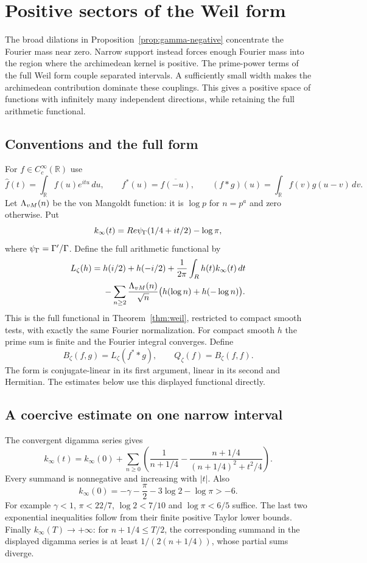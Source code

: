 \section{Positive sectors of the Weil form}
\label{intake:weil:section}

The broad dilations in Proposition~\ref{prop:gamma-negative}
concentrate the Fourier mass near zero. Narrow support instead forces
enough Fourier mass into the region where the archimedean kernel is positive.
The prime-power terms of the full Weil form couple separated intervals.
A sufficiently small width makes the archimedean contribution dominate these couplings.
This gives a positive space of functions with infinitely many independent directions,
while retaining the full arithmetic functional.

\subsection{Conventions and the full form}
For $f\in C_c^\infty(\mathbb R)$ use
\[
 \widehat f(t)=\int_\mathbb R f(u)e^{itu}\,du,\qquad
 f^*(u)=\overline{f(-u)},\qquad
 (f*g)(u)=\int_\mathbb R f(v)g(u-v)\,dv.
\]
Let $\Lambda_{vM}(n)$ be the von Mangoldt function: it is $\log p$ for $n=p^a$ and zero otherwise. Put
\[
 k_\infty(t)=Re\psi_{\Gamma}(1/4+it/2)-\log\pi,
\]
where $\psi_{\Gamma}=\Gamma'/\Gamma$. Define the full arithmetic functional by
\[
\begin{split}
 L_\zeta(h)={}&h(i/2)+h(-i/2)
 +\frac1{2\pi}\int_Rh(t)k_\infty(t)\,dt\\
 &-\sum_{n\ge2}\frac{\Lambda_{vM}(n)}{\sqrt n}
          \bigl(h(\log n)+h(-\log n)\bigr).
\end{split}
\]
This is the full functional in Theorem~\ref{thm:weil}, restricted to
compact smooth tests, with exactly the same Fourier normalization.
For compact smooth $h$ the prime sum is finite and the Fourier integral converges. Define
\[
 B_\zeta(f,g)=L_\zeta(f^**g),\qquad Q_\zeta(f)=B_\zeta(f,f).
\]
The form is conjugate-linear in its first argument, linear in its second and Hermitian. The estimates below use this displayed functional directly.

\subsection{A coercive estimate on one narrow interval}
The convergent digamma series gives
\[
 k_\infty(t)=k_\infty(0)+\sum_{n\ge0}
 \left(\frac1{n+1/4}
 -\frac{n+1/4}{(n+1/4)^2+t^2/4}\right).
\]
Every summand is nonnegative and increasing with $|t|$. Also
\[
 k_\infty(0)=-\gamma-\frac\pi2-3\log2-\log\pi>-6.
\]
For example $\gamma<1$, $\pi<22/7$, $\log2<7/10$ and $\log\pi<6/5$ suffice. The last two exponential inequalities follow from their finite positive Taylor lower bounds. Finally $k_\infty(T)\to+\infty$: for $n+1/4\le T/2$, the corresponding summand in the displayed digamma series is at least $1/(2(n+1/4))$, whose partial sums diverge.

